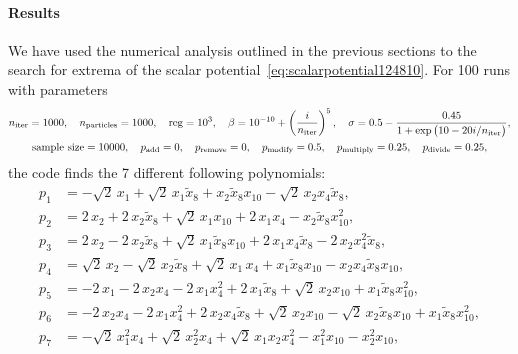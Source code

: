 \documentclass[11pt]{article}
\begin{document}
	\paragraph{Results}
	We have used the numerical analysis outlined in the previous sections to the search for extrema of the scalar potential~\eqref{eq:scalarpotential124810}. For 100 runs with parameters
	\begin{equation}
		\begin{gathered}
			n_{\rm iter} = 1000, \quad n_{\rm particles} = 1000, \quad {\rm reg} = 10^{3}, \quad \beta = 10^{-10} + \left(\frac{i}{n_{\rm iter}}\right)^{5}, \quad \sigma = 0.5 - \frac{0.45}{1+\exp\big(10-20 i/n_{\rm iter}\big)}, \\
			{\rm sample\ size = 10000},\quad p_{\rm add} = 0, \quad p_{\rm remove} = 0, \quad p_{\rm modify} = 0.5, \quad p_{\rm multiply} = 0.25, \quad p_{\rm divide} = 0.25,
		\end{gathered}
	\end{equation}
	the code finds the 7 different following polynomials:
	\begin{subequations} \label{eq:pols}
    \begin{align}
      p_{1} &= -\sqrt{2}\,x_{1} + \sqrt{2}\,x_{1}\tilde{x}_{8} + x_{2}\tilde{x}_{8}x_{10} - \sqrt{2}\,x_{2}x_{4}\tilde{x}_{8},\\
      p_{2} &= 2\,x_{2} + 2\,x_{2}\tilde{x}_{8} + \sqrt{2}\,x_{1}x_{10} + 2\,x_{1}x_{4} - x_{2}\tilde{x}_{8}x_{10}^{2},\\
      p_{3} &= 2\,x_{2} - 2\,x_{2}\tilde{x}_{8} + \sqrt{2}\,x_{1}\tilde{x}_{8}x_{10} + 2\,x_{1}x_{4}\tilde{x}_{8}
      		- 2\,x_{2} x_{4}^{2}\tilde{x}_{8},\\
      p_{4} &= \sqrt{2}\,x_{2} - \sqrt{2}\,x_{2}\tilde{x}_{8} + \sqrt{2}\,x_{1}\,x_{4} + x_{1}\tilde{x}_{8}x_{10}
      		- x_{2}x_{4}\tilde{x}_{8}x_{10},\\
      p_{5} &= -2\,x_{1} - 2\,x_{2}x_{4}- 2\,x_{1}x_{4}^{2} + 2\,x_{1}\tilde{x}_{8} + \sqrt{2}\,x_{2}x_{10}
      		+ x_{1}\tilde{x}_{8}x_{10}^{2},\\
      p_{6} &= -2\,x_{2}x_{4} - 2\,x_{1}x_{4}^{2} + 2\,x_{2}x_{4}\tilde{x}_{8} + \sqrt{2}\,x_{2}x_{10} 
      		- \sqrt{2}\,x_{2}\tilde{x}_{8}x_{10} +  x_{1}\tilde{x}_{8}x_{10}^{2},\\
      p_{7} &= -\sqrt{2}\,x_{1}^{2}x_{4} + \sqrt{2}\,x_{2}^{2}x_{4} + \sqrt{2}\,x_{1}x_{2}x_{4}^{2} - x_{1}^{2}x_{10}
      		- x_{2}^{2}x_{10},
    \end{align}
  \end{subequations}
\end{document}
